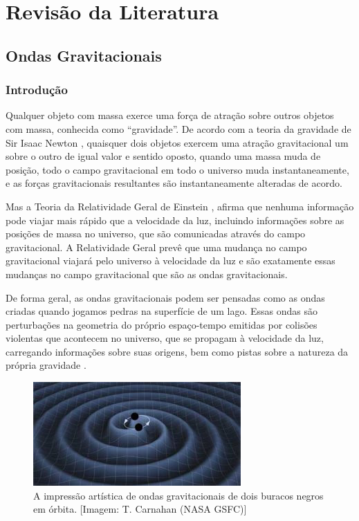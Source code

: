 \chapter{Revisão da Literatura}
\label{chap:revisao-da-literatura}
\section{Ondas Gravitacionais}
\label{sec:ondas-gravitacionais}
\subsection{Introdução}
\label{subsec:ondas-gravitacionais:introducao}

Qualquer objeto com massa exerce uma força de atração sobre outros objetos com massa, conhecida como “gravidade”. De acordo com a teoria da gravidade de Sir Isaac Newton \cite{newton1687philosophiae}, quaisquer dois objetos exercem uma atração gravitacional um sobre o outro de igual valor e sentido oposto, quando uma massa muda de posição, todo o campo gravitacional em todo o universo muda instantaneamente, e as forças gravitacionais resultantes são instantaneamente alteradas de acordo.

Mas a Teoria da Relatividade Geral de Einstein \cite{albert1920realtivity}, afirma que nenhuma informação pode viajar mais rápido que a velocidade da luz, incluindo informações sobre as posições de massa no universo, que são comunicadas através do campo gravitacional. A Relatividade Geral prevê que uma mudança no campo gravitacional viajará pelo universo à velocidade da luz e são exatamente essas mudanças no campo gravitacional que são as ondas gravitacionais.

De forma geral, as ondas gravitacionais podem ser pensadas como as ondas criadas quando jogamos pedras na superfície de um lago. Essas ondas são perturbações na geometria do próprio espaço-tempo emitidas por colisões violentas que acontecem no universo, que se propagam à velocidade da luz, carregando informações sobre suas origens, bem como pistas sobre a natureza da própria gravidade \cite{LSC-VIRGO, abbott2016observation, ramos2018teoria}.

\begin{figure}[ht]
\centering
\includegraphics[width=.9\textwidth]{figuras/binary-wave_tn.jpg}
\caption{A impressão artística de ondas gravitacionais de dois buracos negros em órbita. [Imagem: T. Carnahan (NASA GSFC)]}
\label{fig:space-time}
\end{figure}


